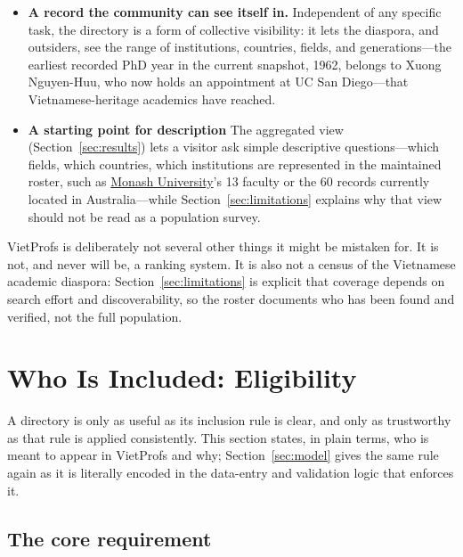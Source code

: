 \documentclass[11pt]{article}
\newcommand{\vplink}[2]{\href{https://vietprofs.roars.dev/?q=#1}{#2}}
\begin{document}
\begin{itemize}
\item \textbf{A record the community can see itself in.} Independent of any specific task, the directory is a form of collective visibility: it lets the diaspora, and outsiders, see the range of institutions, countries, fields, and generations---the earliest recorded PhD year in the current snapshot, 1962, belongs to Xuong Nguyen-Huu, who now holds an appointment at UC San Diego---that Vietnamese-heritage academics have reached.

\item \textbf{A starting point for description} The aggregated view (Section~\ref{sec:results}) lets a visitor ask simple descriptive questions---which fields, which countries, which institutions are represented in the maintained roster, such as \vplink{Monash}{Monash University}'s 13 faculty or the 60 records currently located in Australia---while Section~\ref{sec:limitations} explains why that view should not be read as a population survey.

\end{itemize}

VietProfs is deliberately not several other things it might be mistaken for.
It is not, and never will be, a ranking system.
It is also not a census of the Vietnamese academic diaspora: Section~\ref{sec:limitations} is explicit that coverage depends on search effort and discoverability, so the roster documents who has been found and verified, not the full population.

\section{Who Is Included: Eligibility}
\label{sec:eligibility}
A directory is only as useful as its inclusion rule is clear, and only as trustworthy as that rule is applied consistently.
This section states, in plain terms, who is meant to appear in VietProfs and why; Section~\ref{sec:model} gives the same rule again as it is literally encoded in the data-entry and validation logic that enforces it.

\subsection{The core requirement}
\end{document}
